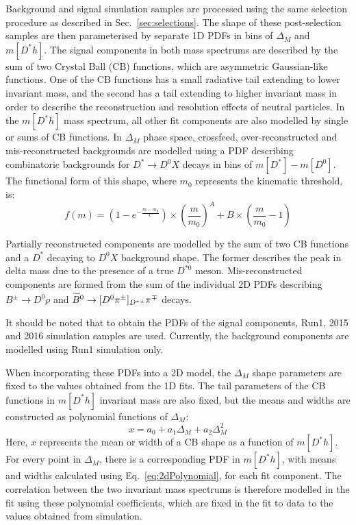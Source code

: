 \documentclass[oneside,12pt]{article}
\newcommand\brobor{\smash[b]{\raisebox{0.6\height}{\scalebox{0.5}{\tiny(}}{\mkern-1.5mu\scriptstyle-\mkern-1.5mu}\raisebox{0.6\height}{\scalebox{0.5}{\tiny)}}}}
\begin{document}
Background and signal simulation samples are processed using the same selection
procedure as described in Sec.~\ref{sec:selections}. The shape of these
post-selection samples are then parameterised by separate 1D PDFs in bins of
$\Delta_M$ and $m[D^*h]$. The signal components in both mass spectrums are
described by the sum of two Crystal Ball (CB) functions, which are asymmetric
Gaussian-like functions. One of the CB functions has a small radiative tail
extending to lower invariant mass, and the second has a tail extending to higher
invariant mass in order to describe the reconstruction and resolution effects of
neutral particles. In the $m[D^*h]$ mass spectrum, all other fit components are
also modelled by single or sums of CB functions. In $\Delta_M$ phase space,
crossfeed, over-reconstructed and mis-reconstructed backgrounds are modelled
using a PDF describing combinatoric backgrounds for $D^{*}\rightarrow D^{0}X$
decays in bins of $m[D^*]-m[D^0]$. The functional form of this shape, where $m_0$
represents the kinematic threshold, is:
\begin{equation}
  f(m)=\left(  1-e^{-\frac{m-m_0}{C}}\right) \times\left(  \frac{m}{m_0}\right) ^A+B\times\left(  \frac{m}{m_0}-1\right) 
  \label{eq:DstD0BG}
\end{equation}

Partially reconstructed components are modelled by the sum of two CB functions
and a $D^*$ decaying to $D^0X$ background shape. The former describes the peak
in delta mass due to the presence of a true $D^{*0}$ meson. Mis-reconstructed
components are formed from the sum of the individual 2D PDFs describing
$B^{\pm}\rightarrow D^0\rho$ and
$\accentset{\brobor}{B}\phantom{}^{0}\rightarrow[D^0\pi^{\pm}]_{D^{*\pm}}\pi^{\mp}$ decays.

It should be noted that to obtain the PDFs of the signal components, Run1, 2015
and 2016 simulation samples are used. Currently, the background components are
modelled using Run1 simulation only. 

When incorporating these PDFs into a 2D model, the $\Delta_M$ shape parameters
are fixed to the values obtained from the 1D fits. The tail parameters of the CB
functions in $m[D^*h]$ invariant mass are also fixed, but the means and widths
are constructed as polynomial functions of $\Delta_M$:  
\begin{equation}
  x = a_0 + a_1 \Delta_M + a_2 \Delta_M^2
  \label{eq:2dPolynomial}
\end{equation}
Here, $x$ represents the mean or width of a CB shape as a function of $m[D^*h]$.
For every point in $\Delta_M$, there is a corresponding PDF in $m[D^*h]$, with
means and widths calculated using Eq.~\eqref{eq:2dPolynomial}, for each fit
component. The correlation between the two invariant mass spectrums is therefore
modelled in the fit using these polynomial coefficients, which are fixed in the
fit to data to the values obtained from simulation.
\end{document}
